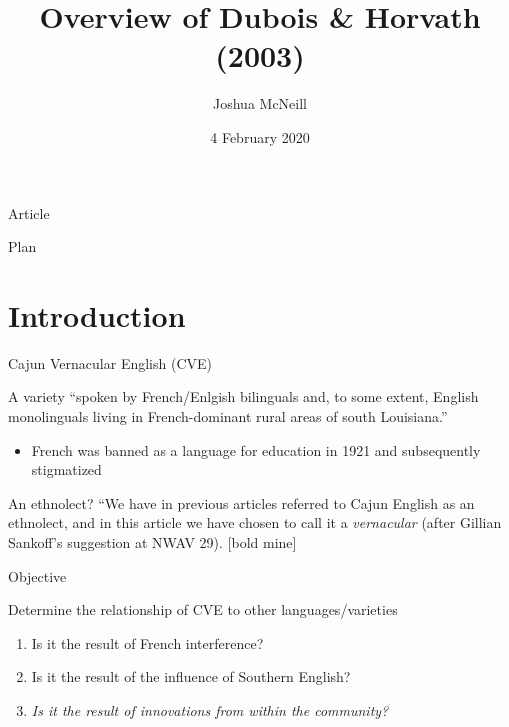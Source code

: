 \documentclass{beamer}
\author{Joshua McNeill}
\date{4 February 2020}
\title{Overview of Dubois \& Horvath (2003)}
\begin{document}
  \begin{frame}
    \titlepage
  \end{frame}

  \begin{frame}{Article}
  \end{frame}

  \begin{frame}{Plan}
    \tableofcontents
  \end{frame}


  \section{Introduction}
    \begin{frame}{Cajun Vernacular English (CVE)}
      \begin{definition}
        A variety ``spoken by French/Enlgish bilinguals and, to some extent, English monolinguals living in French-dominant rural areas of south Louisiana.''
        \begin{itemize}
          \item French was banned as a language for education in 1921 and subsequently stigmatized
        \end{itemize}
      \end{definition}
      \begin{block}{An ethnolect?}
        ``We have in previous articles referred to \alert{Cajun} English as an \alert{ethnolect}, and in this article we have chosen to call it a \emph{vernacular} (after Gillian Sankoff’s suggestion at NWAV 29).
        [bold mine]
      \end{block}
    \end{frame}

    \begin{frame}{Objective}
      \begin{block}{Determine the relationship of CVE to other languages/varieties}
        \begin{enumerate}
          \item Is it the result of French interference?
          \item Is it the result of the influence of Southern English?
          \item \emph{Is it the result of innovations from within the community?}
        \end{enumerate}
      \end{block}
    \end{frame}
\end{document}
